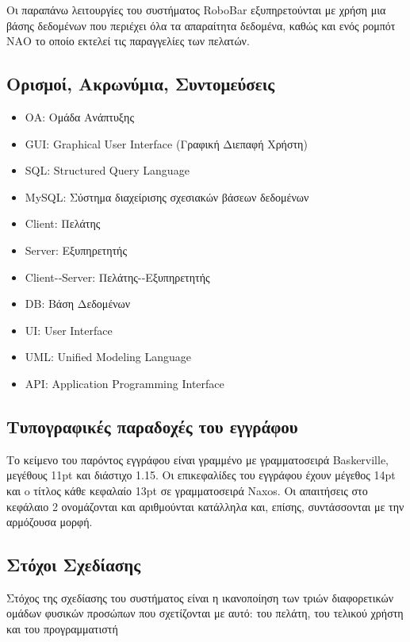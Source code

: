Οι παραπάνω λειτουργίες του συστήματος RoboBar εξυπηρετούνται με χρήση
μια βάσης δεδομένων που περιέχει όλα τα απαραίτητα δεδομένα, καθώς και
ενός ρομπότ ΝΑΟ το οποίο εκτελεί τις παραγγελίες των πελατών.



\subsection{Ορισμοί, Ακρωνύμια, Συντομεύσεις}

\begin{itemize}[noitemsep,nolistsep]
	\item ΟΑ: Ομάδα Ανάπτυξης
	\item GUI: Graphical User Interface (Γραφική Διεπαφή Χρήστη)
	\item SQL: Structured Query Language
	\item MySQL: Σύστημα διαχείρισης σχεσιακών βάσεων δεδομένων
	\item Client: Πελάτης
	\item Server: Εξυπηρετητής
	\item Client-­‐Server: Πελάτης-­‐Εξυπηρετητής
	\item DB: Βάση Δεδομένων
	\item UI: User Interface
	\item UML: Unified Modeling Language
	\item API: Application Programming Interface
\end{itemize}


\subsection{Τυπογραφικές παραδοχές του εγγράφου}


Το κείμενο του παρόντος εγγράφου είναι γραμμένο με γραμματοσειρά
Baskerville, μεγέθους 11pt και διάστιχο 1.15. Οι επικεφαλίδες του
εγγράφου έχουν μέγεθος 14pt και o τίτλος κάθε κεφαλαίο 13pt σε
γραμματοσειρά Naxos. Οι απαιτήσεις στο κεφάλαιο 2 ονομάζονται και
αριθμούνται κατάλληλα και, επίσης, συντάσσονται με την αρμόζουσα
μορφή.


\subsection{Στόχοι Σχεδίασης}

Στόχος της σχεδίασης του συστήματος είναι η ικανοποίηση των τριών
διαφορετικών ομάδων φυσικών προσώπων που σχετίζονται με αυτό: του
πελάτη, του τελικού χρήστη και του προγραμματιστή

